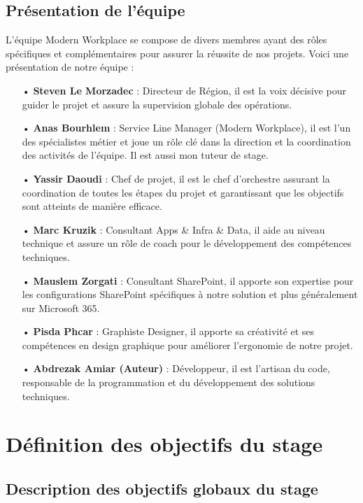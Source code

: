 \subsection{Présentation de l'équipe}


L'équipe Modern Workplace se compose de divers membres ayant des rôles spécifiques et complémentaires pour assurer la réussite de nos projets. Voici une présentation de notre équipe :

\begin{itemize}
    \item[•] \textbf{Steven Le Morzadec} : Directeur de Région, il est la voix décisive pour guider le projet et assure la supervision globale des opérations.
    \item[•] \textbf{Anas Bourhlem} : Service Line Manager (Modern Workplace), il est l’un des spécialistes métier et joue un rôle clé dans la direction et la coordination des activités de l'équipe. Il est aussi mon tuteur de stage.
    \item[•] \textbf{Yassir Daoudi} : Chef de projet, il est le chef d'orchestre assurant la coordination de toutes les étapes du projet et garantissant que les objectifs sont atteints de manière efficace.
    \item[•] \textbf{Marc Kruzik} : Consultant Apps \& Infra \& Data, il aide au niveau technique et assure un rôle de coach pour le développement des compétences techniques.
    \item[•] \textbf{Mauslem Zorgati} : Consultant SharePoint, il apporte son expertise pour les configurations SharePoint spécifiques à notre solution et plus généralement sur Microsoft 365.
    \item[•] \textbf{Pisda Phcar} : Graphiste Designer, il apporte sa créativité et ses compétences en design graphique pour améliorer l'ergonomie de notre projet.
    \item[•] \textbf{Abdrezak Amiar (Auteur)} : Développeur, il est l'artisan du code, responsable de la programmation et du développement des solutions techniques.
\end{itemize}




\section{Définition des objectifs du stage}
\subsection{Description des objectifs globaux du stage}

